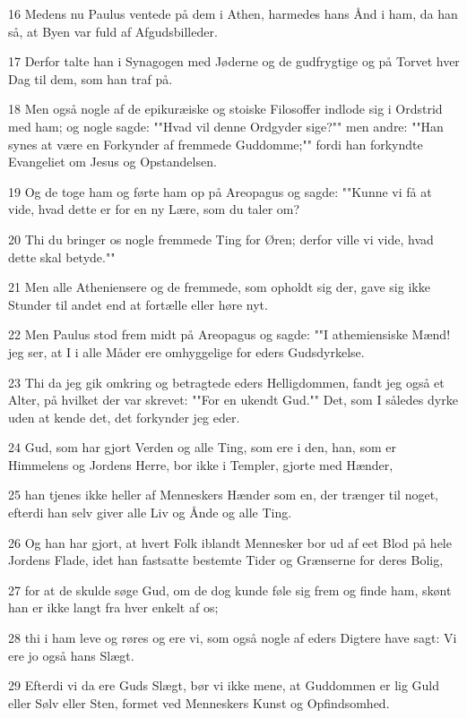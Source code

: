 \par 16 Medens nu Paulus ventede på dem i Athen, harmedes hans Ånd i ham, da han så, at Byen var fuld af Afgudsbilleder.
\par 17 Derfor talte han i Synagogen med Jøderne og de gudfrygtige og på Torvet hver Dag til dem, som han traf på.
\par 18 Men også nogle af de epikuræiske og stoiske Filosoffer indlode sig i Ordstrid med ham; og nogle sagde: ""Hvad vil denne Ordgyder sige?"" men andre: ""Han synes at være en Forkynder af fremmede Guddomme;"" fordi han forkyndte Evangeliet om Jesus og Opstandelsen.
\par 19 Og de toge ham og førte ham op på Areopagus og sagde: ""Kunne vi få at vide, hvad dette er for en ny Lære, som du taler om?
\par 20 Thi du bringer os nogle fremmede Ting for Øren; derfor ville vi vide, hvad dette skal betyde.""
\par 21 Men alle Atheniensere og de fremmede, som opholdt sig der, gave sig ikke Stunder til andet end at fortælle eller høre nyt.
\par 22 Men Paulus stod frem midt på Areopagus og sagde: ""I athemiensiske Mænd! jeg ser, at I i alle Måder ere omhyggelige for eders Gudsdyrkelse.
\par 23 Thi da jeg gik omkring og betragtede eders Helligdommen, fandt jeg også et Alter, på hvilket der var skrevet: ""For en ukendt Gud."" Det, som I således dyrke uden at kende det, det forkynder jeg eder.
\par 24 Gud, som har gjort Verden og alle Ting, som ere i den, han, som er Himmelens og Jordens Herre, bor ikke i Templer, gjorte med Hænder,
\par 25 han tjenes ikke heller af Menneskers Hænder som en, der trænger til noget, efterdi han selv giver alle Liv og Ånde og alle Ting.
\par 26 Og han har gjort, at hvert Folk iblandt Mennesker bor ud af eet Blod på hele Jordens Flade, idet han fastsatte bestemte Tider og Grænserne for deres Bolig,
\par 27 for at de skulde søge Gud, om de dog kunde føle sig frem og finde ham, skønt han er ikke langt fra hver enkelt af os;
\par 28 thi i ham leve og røres og ere vi, som også nogle af eders Digtere have sagt: Vi ere jo også hans Slægt.
\par 29 Efterdi vi da ere Guds Slægt, bør vi ikke mene, at Guddommen er lig Guld eller Sølv eller Sten, formet ved Menneskers Kunst og Opfindsomhed.
